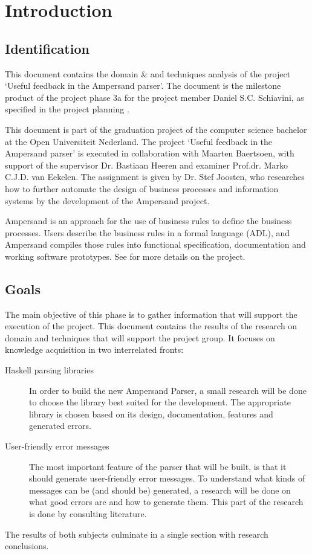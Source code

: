 \section{Introduction}
\subsection{Identification}
This document contains the domain \& and techniques analysis of the project `Useful feedback in the Ampersand parser'.
The document is the milestone product of the project phase 3a for the project member Daniel S.C. Schiavini, as specified in the project planning \cite{plan}.

This document is part of the graduation project of the computer science bachelor at the Open Universiteit Nederland.
The project `Useful feedback in the Ampersand parser' is executed in collaboration with Maarten Baertsoen, with support of the supervisor Dr. Bastiaan Heeren and examiner Prof.dr. Marko C.J.D. van Eekelen.
The assignment is given by Dr. Stef Joosten, who researches how to further automate the design of business processes and information systems by the development of the Ampersand project.

Ampersand is an approach for the use of business rules to define the business processes.
Users describe the business rules in a formal language (ADL), and Ampersand compiles those rules into functional specification, documentation and working software
prototypes.
See \cite{plan} for more details on the project.

\subsection{Goals}
The main objective of this phase is to gather information that will support the execution of the project.
This document contains the results of the research on domain and techniques that will support the project group.
It focuses on knowledge acquisition in two interrelated fronts:
\begin{description}
	\item[Haskell parsing libraries]
	In order to build the new Ampersand Parser, a small research will be done to choose the library best suited for the development.
	The appropriate library is chosen based on its design, documentation, features and generated errors.
	
	\item[User-friendly error messages]
	The most important feature of the parser that will be built, is that it should generate user-friendly error messages.
	To understand what kinds of messages can be (and should be) generated, a research will be done on what good errors are and how to generate them.
	This part of the research is done by consulting literature.
\end{description}
%
The results of both subjects culminate in a single section with research conclusions.


